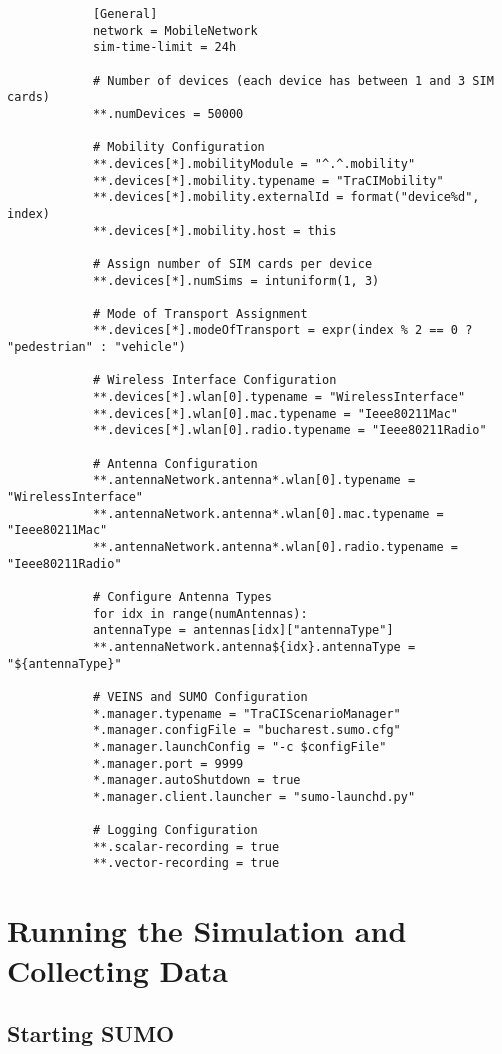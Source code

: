 \documentclass{article}
\begin{document}
		\begin{verbatim}
			[General]
			network = MobileNetwork
			sim-time-limit = 24h
			
			# Number of devices (each device has between 1 and 3 SIM cards)
			**.numDevices = 50000
			
			# Mobility Configuration
			**.devices[*].mobilityModule = "^.^.mobility"
			**.devices[*].mobility.typename = "TraCIMobility"
			**.devices[*].mobility.externalId = format("device%d", index)
			**.devices[*].mobility.host = this
			
			# Assign number of SIM cards per device
			**.devices[*].numSims = intuniform(1, 3)
			
			# Mode of Transport Assignment
			**.devices[*].modeOfTransport = expr(index % 2 == 0 ? "pedestrian" : "vehicle")
			
			# Wireless Interface Configuration
			**.devices[*].wlan[0].typename = "WirelessInterface"
			**.devices[*].wlan[0].mac.typename = "Ieee80211Mac"
			**.devices[*].wlan[0].radio.typename = "Ieee80211Radio"
			
			# Antenna Configuration
			**.antennaNetwork.antenna*.wlan[0].typename = "WirelessInterface"
			**.antennaNetwork.antenna*.wlan[0].mac.typename = "Ieee80211Mac"
			**.antennaNetwork.antenna*.wlan[0].radio.typename = "Ieee80211Radio"
			
			# Configure Antenna Types
			for idx in range(numAntennas):
			antennaType = antennas[idx]["antennaType"]
			**.antennaNetwork.antenna${idx}.antennaType = "${antennaType}"
			
			# VEINS and SUMO Configuration
			*.manager.typename = "TraCIScenarioManager"
			*.manager.configFile = "bucharest.sumo.cfg"
			*.manager.launchConfig = "-c $configFile"
			*.manager.port = 9999
			*.manager.autoShutdown = true
			*.manager.client.launcher = "sumo-launchd.py"
			
			# Logging Configuration
			**.scalar-recording = true
			**.vector-recording = true
		\end{verbatim}
		
		\section{Running the Simulation and Collecting Data}
		
		\subsection{Starting SUMO}
		
\end{document}
